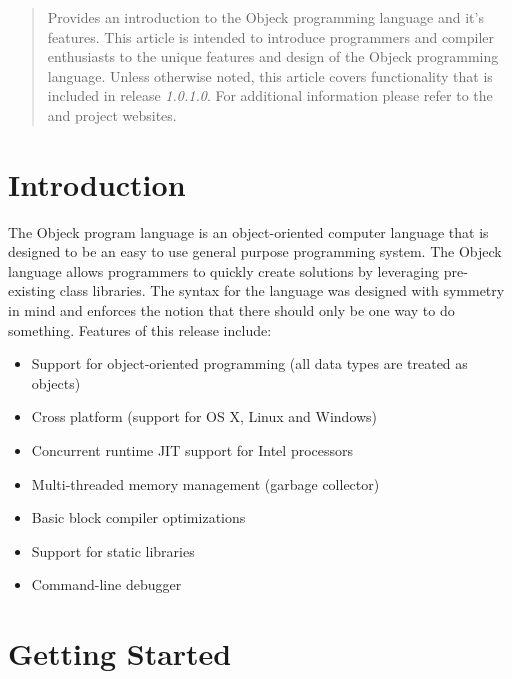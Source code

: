 \documentclass[12pt]{article}
\begin{document}
\maketitle
\thispagestyle{empty}

\vspace{\baselineskip}

\begin{abstract}
Provides an introduction to the Objeck programming language and it's features.  This article is intended to introduce programmers and compiler enthusiasts to the unique features and design of the Objeck programming language.   Unless otherwise noted, this article covers functionality that is included in release \textit{1.0.1.0}.  For additional information please refer to the  and  project websites.
\end{abstract}

\newpage
\tableofcontents
\newpage

\label{Introduction}
\section{Introduction}
The Objeck program language is an object-oriented computer language that is designed to be an easy to use general purpose programming system.  The Objeck language allows programmers to quickly create solutions by leveraging pre-existing class libraries.  The syntax for the language was designed with symmetry in mind and enforces the notion that there should only be one way to do something. Features of this release include:
\begin{itemize}
	\item Support for object-oriented programming (all data types are treated as objects)
	\item Cross platform (support for OS X, Linux and Windows)
	\item Concurrent runtime JIT support for Intel processors
	\item Multi-threaded memory management (garbage collector)
	\item Basic block compiler optimizations
	\item Support for static libraries
	\item Command-line debugger
\end{itemize}

\section{Getting Started}
\end{document}
